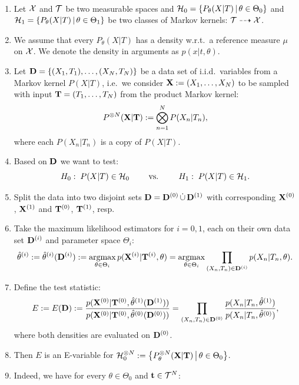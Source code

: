 \begin{Prn} $\,$
    \begin{enumerate}
\item Let $\mathcal{X}$ and $\mathcal{T}$ be two measurable spaces and $\mathcal{H}_0=\left \{ P_\theta(X|T) \,\middle|\, \theta \in \Theta_0 \right \}$
     and $\mathcal{H}_1=\left \{ P_\theta(X|T) \,\middle|\, \theta \in \Theta_1 \right \}$ 
    be two classes of Markov kernels: $\mathcal{T} \dashrightarrow \mathcal{X}$.
\item We assume that every $P_\theta(X|T)$ has a density w.r.t.\ a reference measure $\mu$ on $\mathcal{X}$. 
      We denote the density in arguments as $p(x|t,\theta)$. %
\item Let $\mathbf{D} = \left \{ (X_1,T_1),\dots,(X_N,T_N) \right \}$ be a data set of i.i.d.\ variables from a Markov kernel $P(X|T)$, i.e.\
    we consider $\mathbf{X}:=(X_1,\dots,X_N)$  to be sampled with input $\mathbf{T}=(T_1,\dots,T_N)$ from the product Markov kernel:
    \[ P^{\otimes N}(\mathbf{X}|\mathbf{T}) := \bigotimes_{n=1}^N P(X_n|T_n), \]
    where each $P(X_n|T_n)$ is a copy of $P(X|T)$. 
\item Based on $\mathbf{D}$ we want to test:
    \[ H_0:\; P(X|T) \in \mathcal{H}_0 \qquad \text{ vs. } \qquad H_1:\; P(X|T) \in \mathcal{H}_1. \]
\item Split the data into two disjoint sets $\mathbf{D} = \mathbf{D}^{(0)} \,\dot{\cup}\, \mathbf{D}^{(1)}$ with corresponding $\mathbf{X}^{(0)}$, $\mathbf{X}^{(1)}$ 
    and $\mathbf{T}^{(0)}$, $\mathbf{T}^{(1)}$, resp. %
\item Take the maximum likelihood estimators for $i=0,1$, each on their own data set $\mathbf{D}^{(i)}$ and parameter space $\Theta_i$:
    \[ \hat \theta^{(i)} := \hat \theta^{(i)}(\mathbf{D}^{(i)}) := \operatorname*{argmax}_{\theta \in \Theta_i}  p(\mathbf{X}^{(i)}|\mathbf{T}^{(i)},\theta) 
    = \operatorname*{argmax}_{\theta \in \Theta_i} \prod_{(X_n,T_n) \in \mathbf{D}^{(i)}} p(X_n|T_n,\theta). \]
\item Define the test statistic:
    \[ E := E(\mathbf{D}) := \frac{p(\mathbf{X}^{(0)}|\mathbf{T}^{(0)},\hat \theta^{(1)}(\mathbf{D}^{(1)}))}{p(\mathbf{X}^{(0)}|\mathbf{T}^{(0)},\hat \theta^{(0)}(\mathbf{D}^{(0)}))} 
    = \prod_{(X_n,T_n) \in \mathbf{D}^{(0)}} \frac{p(X_n|T_n,\hat\theta^{(1)})}{p(X_n|T_n,\hat\theta^{(0)})},  \]
    where both densities are evaluated on $\mathbf{D}^{(0)}$.
\item Then $E$ is an E-variable for $\mathcal{H}_0^{\otimes N} := \left \{ P_\theta^{\otimes N}(\mathbf{X}|\mathbf{T}) \,\middle|\, \theta \in \Theta_0 \right \}$.
\item[] Indeed, we have for every $\theta \in \Theta_0$ and $\mathbf{t} \in \mathcal{T}^N$:

\end{enumerate}
\end{Prn}

